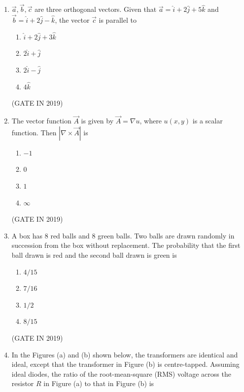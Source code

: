 \documentclass[journal]{IEEEtran}
\begin{document}
\begin{enumerate}
\item $\vec{a}, \vec{b}, \vec{c}$ are three orthogonal vectors. Given that $\vec{a} = \hat{i} + 2\hat{j} + 5\hat{k}$ and $\vec{b} = \hat{i} + 2\hat{j} - \hat{k}$, the vector $\vec{c}$ is parallel to
\begin{multicols}{4}
\begin{enumerate}
\item $\hat{i} + 2\hat{j} + 3\hat{k}$
\item $2\hat{i} + \hat{j}$
\item $2\hat{i} - \hat{j}$
\item $4\hat{k}$
\end{enumerate}
\end{multicols} \hfill(GATE IN 2019)

\item The vector function $\vec{A}$ is given by $\vec{A} = \nabla u$, where $u(x, y)$ is a scalar function. Then $|\nabla \times \vec{A}|$ is
\begin{multicols}{4}
\begin{enumerate}
\item $-1$
\item $0$
\item $1$
\item $\infty$
\end{enumerate}
\end{multicols} \hfill(GATE IN 2019)

\item A box has 8 red balls and 8 green balls. Two balls are drawn randomly in succession from the box without replacement. The probability that the first ball drawn is red and the second ball drawn is green is
\begin{multicols}{4}
\begin{enumerate}
\item $4/15$
\item $7/16$
\item $1/2$
\item $8/15$
\end{enumerate}
\end{multicols} \hfill(GATE IN 2019)

\item In the Figures (a) and (b) shown below, the transformers are identical and ideal, except that the transformer in Figure (b) is centre-tapped. Assuming ideal diodes, the ratio of the root-mean-square (RMS) voltage across the resistor $R$ in Figure (a) to that in Figure (b) is


\end{enumerate}
\end{document}
